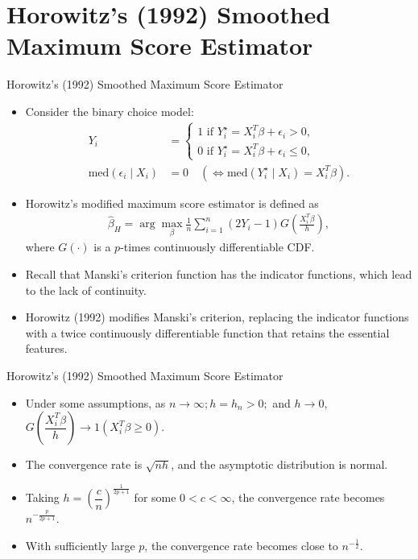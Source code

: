 \documentclass[xcolor=svgnames,dvipdfmx,cjk]{beamer}
\theoremstyle{example}
\begin{document}
\section{Horowitz's (1992) Smoothed Maximum Score Estimator}
  
\begin{frame}{Horowitz's (1992) Smoothed Maximum Score Estimator}
\begin{itemize}
  \item Consider the binary choice model:
        \begin{align*}
            Y_i &= \left\{
              \begin{array}{l}
                1 \text{ if } Y_i^{\star} = X_i^T \beta + \epsilon_i > 0, 
                \\ 
                0 \text{ if } Y_i^{\star} = X_i^T \beta + \epsilon_i \leq 0,
              \end{array}
              \right. \\
            \text{med}(\epsilon_i \mid X_i) &= 0 \quad(\iff \text{med}(Y_i^{\star}\mid X_i)=X_i^T\beta) .
        \end{align*}
  \item \alert{Horowitz's modified maximum score estimator} is defined as
        \begin{align*}
          \hat{\beta}_H = \arg\max_{\beta} \frac{1}{n} \sum_{i=1}^{n} (2Y_i -1)G\left(\frac{X_i^T\beta}{h}\right),
        \end{align*}
        where $G(\cdot)$ is a $p$-times continuously differentiable CDF.
  \item Recall that Manski's criterion function has the indicator functions,
        which lead to the lack of continuity.
  \item Horowitz (1992) modifies Manski's criterion,
        replacing the indicator functions 
        with a twice continuously differentiable function 
        that retains the essential features.
\end{itemize}
\end{frame} 
  
\begin{frame}{Horowitz's (1992) Smoothed Maximum Score Estimator}
\begin{itemize}  
  \item Under some assumptions, as $n \to \infty; h=h_n>0;$ and $h \to 0$,
        $G\left(\dfrac{X_i^T\beta}{h}\right) \to 1(X_i^T\beta \geq 0)$.
  \item The convergence rate is $\sqrt{nh}$, and the asymptotic distribution is normal.
  \item Taking $h = \left( \dfrac{c}{n}\right)^{\frac{1}{2p+1}}$ 
        for some $0<c<\infty$,
        the convergence rate becomes $n^{-\frac{p}{2p+1}}$.
  \item With sufficiently large $p$, 
        the convergence rate 
        becomes close to $n^{-\frac{1}{2}}$.
\end{itemize}
\end{frame} 
\end{document}
